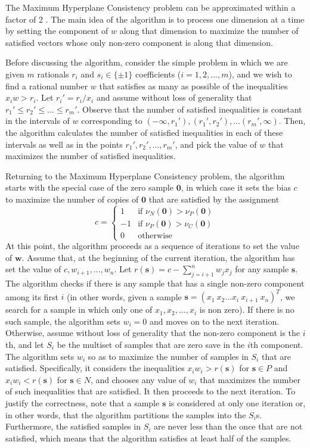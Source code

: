 \documentclass[11pt]{article}
\theoremstyle{definition}
\newcommand{\vect}[1]{\mathbf{#1}}
\begin{document}
The Maximum Hyperplane Consistency problem can be approximated within a factor of 2 \cite{countingapprox}.
The main idea of the algorithm is to process one dimension at a time 
by setting the component of $w$ along that dimension to maximize the number of satisfied vectors
whose only non-zero component is along that dimension.


Before discussing the algorithm, 
consider the simple problem in which we are given $m$ rationals $r_i$ and 
$s_i \in \{ \pm 1 \}$ coefficients ($i = 1, 2, \dots, m$),
and we wish to find a rational number $w$ that satisfies as many as possible of the inequalities
$x_i w > r_i$.
Let $r_i' = r_i / x_i$ and assume without loss of generality that 
$r_1' \leq r_2' \leq \dots \leq r_m'$.
Observe that the number of satisfied inequalities is constant in the 
intervals of $w$ corresponding to
$(-\infty, r_1'), (r_1', r_2'), \dots (r_m', \infty)$.
Then, the algorithm calculates the number of satisfied inequalities in each of these intervals 
as well as in the points $r_1', r_2', \dots, r_m'$, and pick the
value of $w$ that maximizes the number of satisfied inequalities. 

Returning to the Maximum Hyperplane Consistency problem,  
the algorithm starts with the special case of the zero sample $\vect{0}$, in which 
case it sets the bias $c$ to maximize the number of copies of $\vect{0}$ that are satisfied by
the assignment 
$$c = \begin{cases} 
1 & \text{if } \nu_N(\vect{0}) > \nu_P(\vect{0})\\
-1 & \text{if } \nu_P(\vect{0}) > \nu_C(\vect{0})\\
0 & \text{otherwise}
\end{cases}$$
At this point, the algorithm proceeds as a sequence of iterations to set the value of $\vect{w}$.
Assume that, at the beginning of the current iteration,
the algorithm has set the value of $c, w_{i+1}, \dots, w_n$.
Let $r(\vect{s}) = c - \sum_{j = i + 1}^n w_j x_j$ for any sample $\vect{s}$.
The algorithm checks if there is any sample that has a single non-zero component among its first $i$
(in other words, given a sample $\vect{s} = (x_1 ~ x_2 \dots x_i ~ x_{i+1} ~ x_n)^T$,
we search for a sample in which only one of $x_1, x_2, \dots , x_i$ is non zero).
If there is no such sample, the algorithm sets $w_i = 0$ and moves on to the next iteration.
Otherwise, assume without loss of generality that the non-zero component is the $i$th,
and let $S_i$ be the multiset of samples that are zero save in the $i$th component. 
The algorithm sets $w_i$ so as to maximize the number of samples in $S_i$ that are satisfied. 
Specifically, it considers the inequalities 
$x_i w_i > r(\vect{s})$ for $\vect{s} \in P$ and 
$x_i w_i < r(\vect{s})$ for $\vect{s} \in N$, and
chooses any value of $w_i$ that maximizes the number of such inequalities that are satisfied. 
It then proceeds to the next iteration.
To justify the correctness, note that a sample $\vect{s}$ is considered at only one iteration or,
in other words, that the algorithm partitions the samples into the $S_i$s.
Furthermore, the satisfied samples in $S_i$ are never less than the once that are not satisfied,
which means that the algorithm satisfies at least half of the samples.
\end{document}
